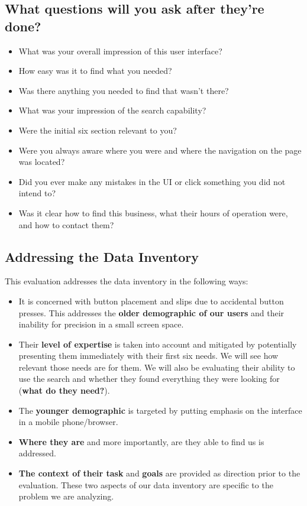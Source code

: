 \subsection{What questions will you ask after they’re done?}
\begin{itemize}
\item
  What was your overall impression of this user interface?
\item
  How easy was it to find what you needed?
\item
  Was there anything you needed to find that wasn't there?
\item
  What was your impression of the search capability?
\item
  Were the initial six section relevant to you?
\item
  Were you always aware where you were and where the navigation on the page was located?
\item
  Did you ever make any mistakes in the UI or click something you did not intend to?
\item
  Was it clear how to find this business, what their hours of operation were, and how to contact them?
\end{itemize}

\subsection{Addressing the Data Inventory}
This evaluation addresses the data inventory in the following ways:

\begin{itemize}
\item
  It is concerned with button placement and slips due to accidental button presses. This addresses the \textbf{older demographic of our users} and their inability for precision in a small screen space.
\item
  Their \textbf{level of expertise} is taken into account and mitigated by potentially presenting them immediately with their first six needs. We will see how relevant those needs are for them. We will also be evaluating their ability to use the search and whether they found everything they were looking for (\textbf{what do they need?}).
\item
  The \textbf{younger demographic} is targeted by putting emphasis on the interface in a mobile phone/browser.
\item
  \textbf{Where they are} and more importantly, are they able to find us is addressed.
\item
  \textbf{The context of their task} and \textbf{goals} are provided as direction prior to the evaluation. These two aspects of our data inventory are specific to the problem we are analyzing.
\end{itemize}

